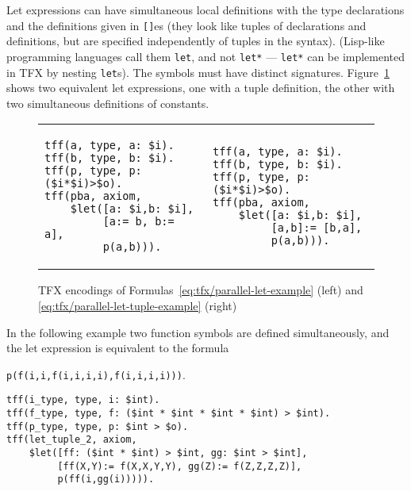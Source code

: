 Let expressions can have simultaneous local definitions
with the type declarations and the definitions given in {\tt []}es
(they look like tuples of declarations and definitions, but are
specified independently of tuples in the syntax).
(Lisp-like programming languages call them \verb'let', and 
not \verb'let*' --- \verb'let*' can be implemented in TFX by nesting
\verb'let's).
The symbols must have distinct signatures.
Figure~\ref{fig:tfx/pba-tfx} shows two equivalent let expressions, one with a tuple definition, the other with two simultaneous definitions of constants.
\begin{figure}[htbp]
\hspace{-0.24cm}
\begin{tabular}[t]{ll}
\begin{minipage}{0.48\textwidth}
\begin{lstlisting}[language=tptp]
tff(a, type, a: $i).
tff(b, type, b: $i).
tff(p, type, p: ($i*$i)>$o).
tff(pba, axiom,
    $let([a: $i,b: $i],
         [a:= b, b:= a],
         p(a,b))).
\end{lstlisting}
\end{minipage}
    &
\begin{minipage}{0.48\textwidth}
\begin{lstlisting}[language=tptp]
tff(a, type, a: $i).
tff(b, type, b: $i).
tff(p, type, p: ($i*$i)>$o).
tff(pba, axiom,
    $let([a: $i,b: $i],
         [a,b]:= [b,a],
         p(a,b))).
\end{lstlisting}
\end{minipage}
\\
\end{tabular}
\caption{TFX encodings of Formulas~\ref{eq:tfx/parallel-let-example} (left) and \ref{eq:tfx/parallel-let-tuple-example} (right)}
\label{fig:tfx/pba-tfx}
\end{figure}

In the following example two function symbols are defined simultaneously, and the let expression is equivalent to the formula \begin{center}\lstinline[language=tptp,backgroundcolor=\color{lstgrey}]{p(f(i,i,f(i,i,i,i),f(i,i,i,i)))}.\end{center}
\begin{lstlisting}[language=tptp]
tff(i_type, type, i: $int).
tff(f_type, type, f: ($int * $int * $int * $int) > $int).
tff(p_type, type, p: $int > $o).
tff(let_tuple_2, axiom,
    $let([ff: ($int * $int) > $int, gg: $int > $int],
         [ff(X,Y):= f(X,X,Y,Y), gg(Z):= f(Z,Z,Z,Z)],
         p(ff(i,gg(i))))).
\end{lstlisting}


